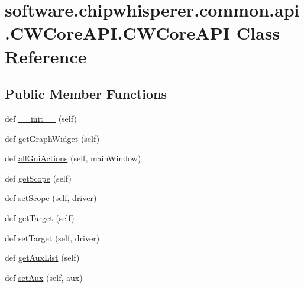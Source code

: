 \hypertarget{classsoftware_1_1chipwhisperer_1_1common_1_1api_1_1CWCoreAPI_1_1CWCoreAPI}{}\section{software.\+chipwhisperer.\+common.\+api.\+C\+W\+Core\+A\+P\+I.\+C\+W\+Core\+A\+P\+I Class Reference}
\label{classsoftware_1_1chipwhisperer_1_1common_1_1api_1_1CWCoreAPI_1_1CWCoreAPI}
\subsection*{Public Member Functions}
\begin{DoxyCompactItemize}
\item 
def \hyperlink{classsoftware_1_1chipwhisperer_1_1common_1_1api_1_1CWCoreAPI_1_1CWCoreAPI_a541e5f5b3aecd0536a68827773624a51}{\+\_\+\+\_\+init\+\_\+\+\_\+} (self)
\item 
def \hyperlink{classsoftware_1_1chipwhisperer_1_1common_1_1api_1_1CWCoreAPI_1_1CWCoreAPI_aa5211311b979aed1d96a765b32648e71}{get\+Graph\+Widget} (self)
\item 
def \hyperlink{classsoftware_1_1chipwhisperer_1_1common_1_1api_1_1CWCoreAPI_1_1CWCoreAPI_a73bb243c525fc26cc898b31582d0afd6}{all\+Gui\+Actions} (self, main\+Window)
\item 
def \hyperlink{classsoftware_1_1chipwhisperer_1_1common_1_1api_1_1CWCoreAPI_1_1CWCoreAPI_a1eba69964de98df6f2240f525f8c8615}{get\+Scope} (self)
\item 
def \hyperlink{classsoftware_1_1chipwhisperer_1_1common_1_1api_1_1CWCoreAPI_1_1CWCoreAPI_abe1d723dca794663b677fc26fad1e34c}{set\+Scope} (self, driver)
\item 
def \hyperlink{classsoftware_1_1chipwhisperer_1_1common_1_1api_1_1CWCoreAPI_1_1CWCoreAPI_a766fa7a99cf7ed210de876a4207caef8}{get\+Target} (self)
\item 
def \hyperlink{classsoftware_1_1chipwhisperer_1_1common_1_1api_1_1CWCoreAPI_1_1CWCoreAPI_aa2ef227390a2da44d936176eb620777e}{set\+Target} (self, driver)
\item 
def \hyperlink{classsoftware_1_1chipwhisperer_1_1common_1_1api_1_1CWCoreAPI_1_1CWCoreAPI_ad0264c41ce250ad794372df2b0bb42e6}{get\+Aux\+List} (self)
\item 
def \hyperlink{classsoftware_1_1chipwhisperer_1_1common_1_1api_1_1CWCoreAPI_1_1CWCoreAPI_ac0ff93f13bf3c4bff0c481f15c059710}{set\+Aux} (self, aux)

\end{DoxyCompactItemize}
